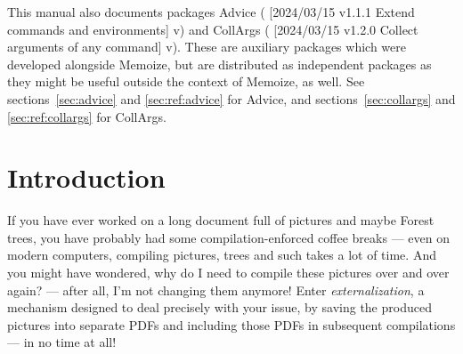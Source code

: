 \documentclass[a4paper,11pt]{article}
\begin{document}
\vfill

\begin{tcolorbox}[colback=emphcolor, fontupper=\footnotesize]
  This manual also documents packages Advice
  ({\ParseProvidesPackage
    [2024/03/15 v1.1.1 Extend commands and environments]
    v\packagever}) and CollArgs
  ({\ParseProvidesPackage
    [2024/03/15 v1.2.0 Collect arguments of any command]
    v\packagever}).  These are auxiliary
  packages which were developed alongside Memoize, but are distributed as
  independent packages as they might be useful outside the context of Memoize,
  as well.  See sections~\ref{sec:advice} and \ref{sec:ref:advice} for Advice, and
  sections~\ref{sec:collargs} and \ref{sec:ref:collargs} for CollArgs.
\end{tcolorbox}
\endgroup



\section*{Introduction}
\label{sec:intro}

\begin{tcolorbox}[
    title={\introboxtitle{What} is externalization and why you might want it?},
  ]
  If you have ever worked on a long document full of \TikZ pictures and maybe
  Forest trees, you have probably had some compilation-enforced coffee breaks
  --- even on modern computers, compiling pictures, trees and such takes a lot
  of time.  And you might have wondered, why do I need to compile these
  pictures over and over again? --- after all, I'm not changing them anymore!
  Enter \emph{externalization}, a mechanism designed to deal precisely with
  your issue, by saving the produced pictures into separate PDFs and including
  those PDFs in subsequent compilations --- in no time at all!
\end{tcolorbox}
\end{document}
